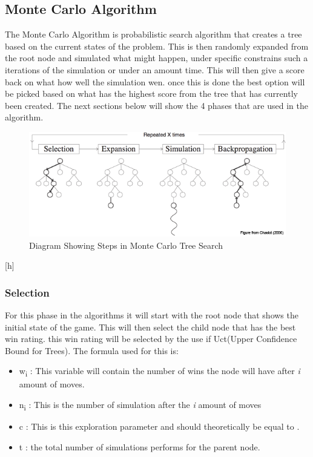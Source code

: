 \subsection {Monte Carlo Algorithm}
The Monte Carlo Algorithm is probabilistic search algorithm that creates a tree based on the current states of the problem. This is then randomly expanded from the root node and simulated what might happen, under specific constrains such a iterations of the simulation or under an amount time. This will then give a score back on what how well the simulation wen. once this is done the best option will be picked based on what has the highest score from the tree that has currently been created. The next sections below will show the 4 phases that are used in the algorithm.
\begin{figure}[h]
\centering
\includegraphics[width=15cm]{mcts-algorithm-1a}
\caption{Diagram Showing Steps in Monte Carlo Tree Search}
\end{figure}[h]
\subsubsection{Selection}
For this phase in the algorithms it will start with the root node that shows the initial state of the game. This will then select the child node that has the best win rating. this win rating will be selected by the use if Uct(Upper Confidence Bound for Trees). The formula used for this is:

\begin{itemize}
\item w\textsubscript{i} : This variable will contain the number of wins the node will have after \textit{i} amount of moves.
\item n\textsubscript{i} : This is the number of simulation after the \textit{i} amount of moves
\item c : This is this exploration parameter and should theoretically be equal to .
\item t : the total number of simulations performs for the parent node.
\cite{mctswithcode}
\end{itemize}

